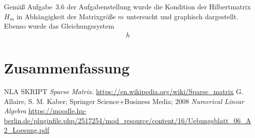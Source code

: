 \documentclass[smallheadings]{scrartcl}
\numberwithin{equation}{section}
\begin{document}
Gemäß Aufgabe~3.6 der Aufgabenstellung wurde die Kondition der Hilbertmatrix $H_m$ in Abhängigkeit der Matrixgröße $m$ untersucht und graphisch dargestellt. Ebenso wurde das Gleichungssystem 
\begin{align}
h
\end{align}

\section{Zusammenfassung}

\begin{thebibliography}{9}
 NLA SKRIPT \textit{Sparse Matrix}. 
\url{https://en.wikipedia.org/wiki/Sparse_matrix}
 G. Allaire, S. M. Kaber; Springer Science+Business Media; 2008 \textit{Numerical Linear Algebra}
\url{https://moodle.hu-berlin.de/pluginfile.php/2517254/mod_resource/content/16/Uebungsblatt_06_A2_Loesung.pdf}
\end{thebibliography}


\end{document}
